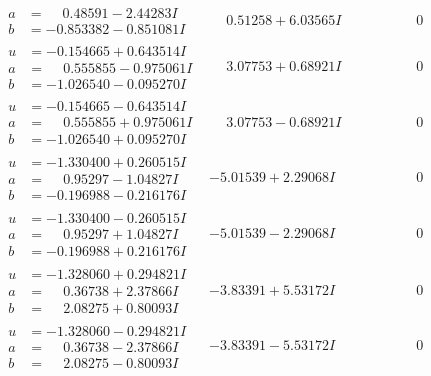 \documentclass[1p]{elsarticle_modified}
\theoremstyle{definition}
\begin{document}
$$\begin{array}{c|c|c}
\begin{aligned}
a &= \phantom{-}0.48591 - 2.44283 I \\
b &= -0.853382 - 0.851081 I\end{aligned}
 & \phantom{-}0.51258 + 6.03565 I & \phantom{-0.000000 } 0 \\ \hline\begin{aligned}
u &= -0.154665 + 0.643514 I \\
a &= \phantom{-}0.555855 - 0.975061 I \\
b &= -1.026540 - 0.095270 I\end{aligned}
 & \phantom{-}3.07753 + 0.68921 I & \phantom{-0.000000 } 0 \\ \hline\begin{aligned}
u &= -0.154665 - 0.643514 I \\
a &= \phantom{-}0.555855 + 0.975061 I \\
b &= -1.026540 + 0.095270 I\end{aligned}
 & \phantom{-}3.07753 - 0.68921 I & \phantom{-0.000000 } 0 \\ \hline\begin{aligned}
u &= -1.330400 + 0.260515 I \\
a &= \phantom{-}0.95297 - 1.04827 I \\
b &= -0.196988 - 0.216176 I\end{aligned}
 & -5.01539 + 2.29068 I & \phantom{-0.000000 } 0 \\ \hline\begin{aligned}
u &= -1.330400 - 0.260515 I \\
a &= \phantom{-}0.95297 + 1.04827 I \\
b &= -0.196988 + 0.216176 I\end{aligned}
 & -5.01539 - 2.29068 I & \phantom{-0.000000 } 0 \\ \hline\begin{aligned}
u &= -1.328060 + 0.294821 I \\
a &= \phantom{-}0.36738 + 2.37866 I \\
b &= \phantom{-}2.08275 + 0.80093 I\end{aligned}
 & -3.83391 + 5.53172 I & \phantom{-0.000000 } 0 \\ \hline\begin{aligned}
u &= -1.328060 - 0.294821 I \\
a &= \phantom{-}0.36738 - 2.37866 I \\
b &= \phantom{-}2.08275 - 0.80093 I\end{aligned}
 & -3.83391 - 5.53172 I & \phantom{-0.000000 } 0 \\ \hline\begin{aligned}

\end{aligned}
\end{array}$$
\end{document}
